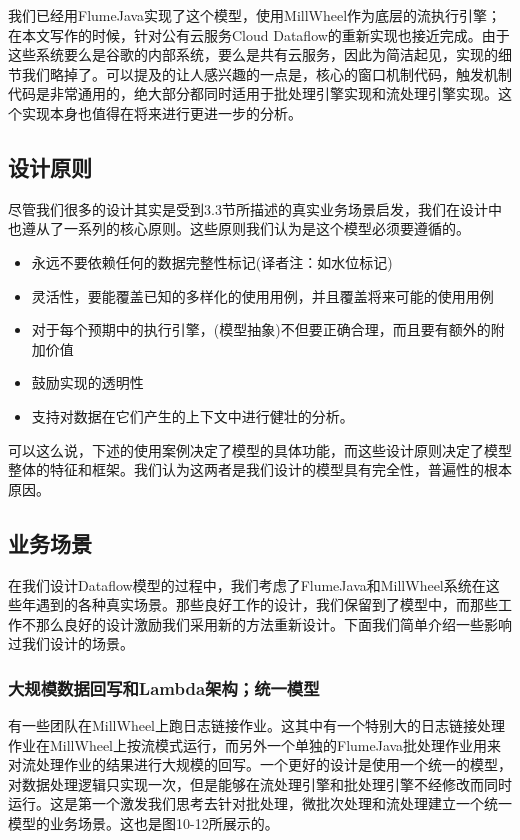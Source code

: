 \documentclass[oneside]{ctexbook}
\begin{document}
我们已经用FlumeJava实现了这个模型，使用MillWheel作为底层的流执行引擎；在本文写作的时候，针对公有云服务Cloud Dataflow的重新实现也接近完成。由于这些系统要么是谷歌的内部系统，要么是共有云服务，因此为简洁起见，实现的细节我们略掉了。可以提及的让人感兴趣的一点是，核心的窗口机制代码，触发机制代码是非常通用的，绝大部分都同时适用于批处理引擎实现和流处理引擎实现。这个实现本身也值得在将来进行更进一步的分析。

\subsection{设计原则}

尽管我们很多的设计其实是受到3.3节所描述的真实业务场景启发，我们在设计中也遵从了一系列的核心原则。这些原则我们认为是这个模型必须要遵循的。

\begin{itemize}
\item 永远不要依赖任何的数据完整性标记(译者注：如水位标记)
\item 灵活性，要能覆盖已知的多样化的使用用例，并且覆盖将来可能的使用用例
\item 对于每个预期中的执行引擎，(模型抽象)不但要正确合理，而且要有额外的附加价值
\item 鼓励实现的透明性
\item 支持对数据在它们产生的上下文中进行健壮的分析。
\end{itemize}

可以这么说，下述的使用案例决定了模型的具体功能，而这些设计原则决定了模型整体的特征和框架。我们认为这两者是我们设计的模型具有完全性，普遍性的根本原因。

\subsection{业务场景}

在我们设计Dataflow模型的过程中，我们考虑了FlumeJava和MillWheel系统在这些年遇到的各种真实场景。那些良好工作的设计，我们保留到了模型中，而那些工作不那么良好的设计激励我们采用新的方法重新设计。下面我们简单介绍一些影响过我们设计的场景。

\subsubsection{大规模数据回写和Lambda架构；统一模型}

有一些团队在MillWheel上跑日志链接作业。这其中有一个特别大的日志链接处理作业在MillWheel上按流模式运行，而另外一个单独的FlumeJava批处理作业用来对流处理作业的结果进行大规模的回写。一个更好的设计是使用一个统一的模型，对数据处理逻辑只实现一次，但是能够在流处理引擎和批处理引擎不经修改而同时运行。这是第一个激发我们思考去针对批处理，微批次处理和流处理建立一个统一模型的业务场景。这也是图10-12所展示的。
\end{document}
